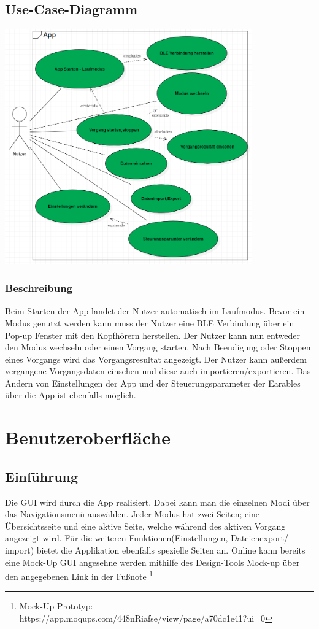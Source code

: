 \documentclass[a4paper,12pt]{article}
\begin{document}
  \subsection{Use-Case-Diagramm}
  \begin{center}
	\includegraphics[width=0.8\textwidth]{./Diagramme/Use-CaseDiagramm.png} 
  \end{center}

\subsubsection{Beschreibung} 
Beim Starten der App landet der Nutzer automatisch im Laufmodus. Bevor ein Modus genutzt werden kann muss der Nutzer eine BLE Verbindung über ein Pop-up Fenster mit den Kopfhörern herstellen. Der Nutzer kann nun entweder den Modus wechseln oder einen \Gls{Vorgang} starten. Nach Beendigung oder Stoppen eines Vorgangs wird das Vorgangsresultat angezeigt. Der Nutzer kann außerdem vergangene Vorgangsdaten einsehen und diese auch importieren/exportieren. Das Ändern von Einstellungen der App und der \Gls{Steuerungsparameter} der \Gls{Earables} über die App ist ebenfalls möglich.
\section{Benutzeroberfläche}
\subsection{Einführung}
Die \Gls{GUI} wird durch die App realisiert. Dabei kann man die einzelnen Modi über das Navigationsmenü auswählen. Jeder Modus hat zwei Seiten; eine Übersichtsseite und eine aktive Seite, welche während des aktiven \Gls{Vorgang} angezeigt wird. Für die weiteren Funktionen(Einstellungen, Dateienexport/-import) bietet die Applikation ebenfalls spezielle Seiten an.
Online kann bereits eine Mock-Up \Gls{GUI} angesehne werden mithilfe des Design-Tools \glqq Mock-up\grqq{} über den angegebenen Link in der Fußnote \footnote[1]{Mock-Up Prototyp: https://app.moqups.com/448nRiafse/view/page/a70dc1e41?ui=0}
\end{document}
